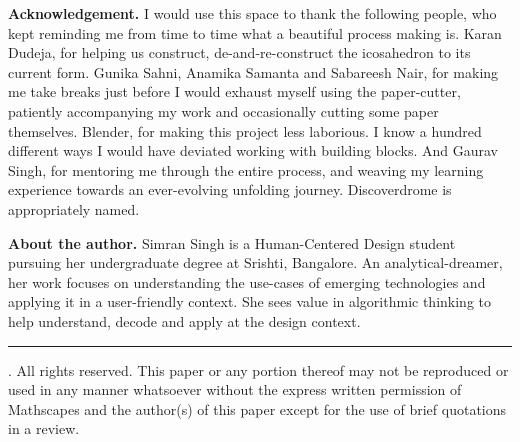 \documentclass[a4paper,7pt]{article}
\begin{document}
\vspace{1cm}
\footnotesize \textbf{Acknowledgement.} I would use this space to thank the following people, who kept reminding me from time to time what a beautiful process making is. Karan Dudeja, for helping us construct, de-and-re-construct the icosahedron to its current form. Gunika Sahni, Anamika Samanta and Sabareesh Nair, for making me take breaks just before I would exhaust myself using the paper-cutter, patiently accompanying my work and occasionally cutting some paper themselves. Blender, for making this project less laborious. I know a hundred different ways I would have deviated working with building blocks. And Gaurav Singh, for mentoring me through the entire process, and weaving my learning experience towards an ever-evolving unfolding journey. Discoverdrome is appropriately named.

\vspace{0.5cm}
\textbf{About the author.} Simran Singh is a Human-Centered Design student pursuing her undergraduate degree at Srishti, Bangalore. An analytical-dreamer, her work focuses on understanding the use-cases of emerging technologies and applying it in a user-friendly context. She sees value in algorithmic thinking to help understand, decode and apply at the design context.

\vspace*{\fill}
\rule{\textwidth}{0.4pt}
\footnotesize \mscpy. All rights reserved. This paper or any portion thereof may not be reproduced or used in any manner whatsoever without the express written permission of Mathscapes and the author(s) of this paper except for the use of brief quotations in a review.
\end{document}
